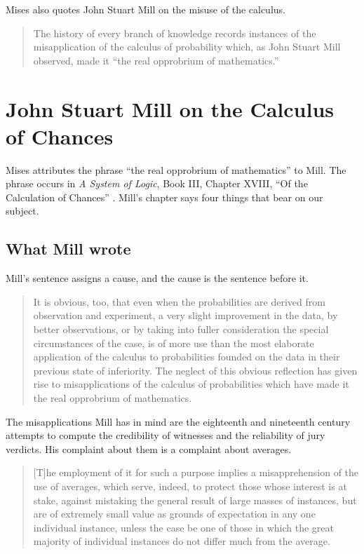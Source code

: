 \documentclass[12pt]{article}
\begin{document}
Mises also quotes John Stuart Mill on the misuse of the calculus.

\begin{quote}
The history of every branch of knowledge records instances of the misapplication
of the calculus of probability which, as John Stuart Mill observed, made it
``the real opprobrium of mathematics.''
\hfill \citep[pp.~106--107]{Mises1998HumanAction}
\end{quote}

\section{John Stuart Mill on the Calculus of Chances}
\label{sec:mill}

Mises attributes the phrase ``the real opprobrium of mathematics'' to Mill.
The phrase occurs in \emph{A System of Logic}, Book III, Chapter XVIII, ``Of
the Calculation of Chances'' \citep{Mill1882Logic}.  Mill's chapter says four
things that bear on our subject.

\subsection{What Mill wrote}

Mill's sentence assigns a cause, and the cause is the sentence before it.

\begin{quote}
It is obvious, too, that even when the probabilities are derived from
observation and experiment, a very slight improvement in the data, by better
observations, or by taking into fuller consideration the special circumstances
of the case, is of more use than the most elaborate application of the calculus
to probabilities founded on the data in their previous state of inferiority.
The neglect of this obvious reflection has given rise to misapplications of the
calculus of probabilities which have made it the real opprobrium of mathematics.
\hfill \citep[Bk.~III, ch.~XVIII, \S3]{Mill1882Logic}
\end{quote}

The misapplications Mill has in mind are the eighteenth and nineteenth century
attempts to compute the credibility of witnesses and the reliability of jury
verdicts.  His complaint about them is a complaint about averages.

\begin{quote}
[T]he employment of it for such a purpose implies a misapprehension of the use
of averages, which serve, indeed, to protect those whose interest is at stake,
against mistaking the general result of large masses of instances, but are of
extremely small value as grounds of expectation in any one individual instance,
unless the case be one of those in which the great majority of individual
instances do not differ much from the average.
\hfill \citep[Bk.~III, ch.~XVIII, \S3]{Mill1882Logic}
\end{quote}
\end{document}
